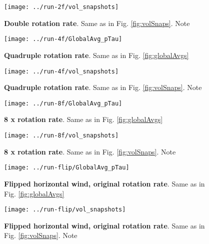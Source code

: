 \documentclass[a4paper,11pt]{article}
\begin{document}
\begin{figure}
\centering
\texttt{[image: ../run-2f/vol\_snapshots]}
\caption{\textbf{Double rotation rate}. Same as in Fig. \ref{fig:volSnaps}. Note }
\label{fig:2f_volSnaps}
\end{figure}


\begin{figure}
\centering
\texttt{[image: ../run-4f/GlobalAvg\_pTau]}
\caption{\textbf{Quadruple rotation rate}. Same as in Fig. \ref{fig:globalAvgs}}
\label{fig:4f_globalAvgs}
\end{figure}

\begin{figure}
\centering
\texttt{[image: ../run-4f/vol\_snapshots]}
\caption{\textbf{Quadruple rotation rate}. Same as in Fig. \ref{fig:volSnaps}. Note }
\label{fig:4f_volSnaps}
\end{figure}


\begin{figure}
\centering
\texttt{[image: ../run-8f/GlobalAvg\_pTau]}
\caption{\textbf{8 x rotation rate}. Same as in Fig. \ref{fig:globalAvgs}}
\label{fig:8f_globalAvgs}
\end{figure}

\begin{figure}
\centering
\texttt{[image: ../run-8f/vol\_snapshots]}
\caption{\textbf{8 x rotation rate}. Same as in Fig. \ref{fig:volSnaps}. Note }
\label{fig:8f_volSnaps}
\end{figure}



\begin{figure}
\centering
\texttt{[image: ../run-flip/GlobalAvg\_pTau]}
\caption{\textbf{Flipped horizontal wind, original rotation rate}. Same as in Fig. \ref{fig:globalAvgs}}
\label{fig:flipGlobalAvgs}
\end{figure}

\begin{figure}
\centering
\texttt{[image: ../run-flip/vol\_snapshots]}
\caption{\textbf{Flipped horizontal wind, original rotation rate}. Same as in Fig. \ref{fig:volSnaps}. Note }
\label{fig:flipVolSnaps}
\end{figure}
\end{document}
